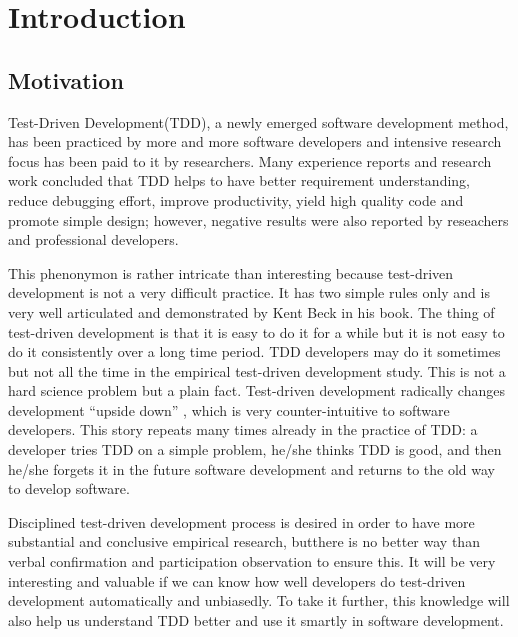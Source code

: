 \chapter{Introduction}
\label{chap:Intro}

\section{Motivation}
\label{sec:motivation}
Test-Driven Development(TDD), a newly emerged software development method,
has been practiced by more and more software developers and intensive
research focus has been paid to it by researchers. Many experience reports
and research work concluded that TDD helps to have better requirement
understanding, reduce debugging effort, improve productivity, yield high
quality code and promote simple
design\cite{Beck:03,George:03,Maximilien:03}; however, negative results
were also reported by reseachers and professional developers.

This phenonymon is rather intricate than interesting because test-driven
development is not a very difficult practice. It has two simple rules only
and is very well articulated and demonstrated by Kent Beck in his
book\cite{Beck:03}. The thing of test-driven development is that it is easy
to do it for a while but it is not easy to do it consistently over a long
time period. TDD developers may do it sometimes but not all the time in the
empirical test-driven development study. This is not a hard science problem
but a plain fact.  Test-driven development radically changes development
``upside down''\cite{Pipka:03} , which is very counter-intuitive to
software developers. This story repeats many times already in the practice
of TDD: a developer tries TDD on a simple problem, he/she thinks TDD is
good, and then he/she forgets it in the future software development and
returns to the old way to develop software.

Disciplined test-driven development process is desired in order to have
more substantial and conclusive empirical research, butthere is no better
way than verbal confirmation and participation observation to ensure this.
It will be very interesting and valuable if we can know how well developers
do test-driven development automatically and unbiasedly. To take it
further, this knowledge will also help us understand TDD better and use it
smartly in software development.

